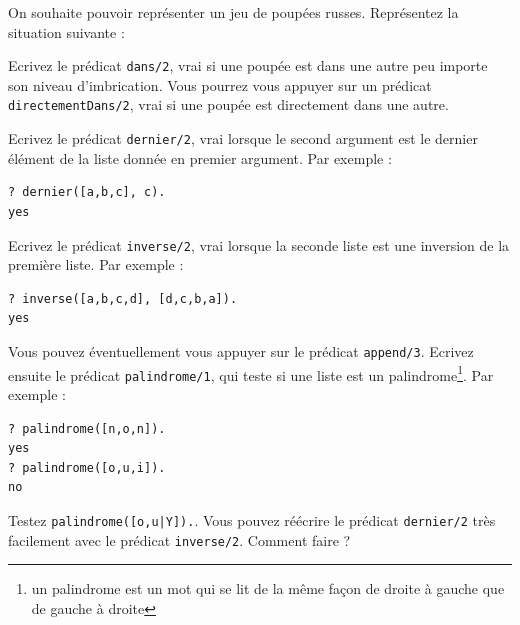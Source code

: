 \documentclass[a4paper]{article}
\newenvironment{CAnswer}{\color{red}\begin{Answer}}
                        {\end{Answer}}
\begin{document}
\begin{Exercise}[title={Poupées russes}]
On souhaite pouvoir représenter un jeu de poupées russes. Représentez la
situation suivante :
\begin{center}
\end{center}
Ecrivez le prédicat \verb$dans/2$, vrai si une poupée est dans une autre peu
importe son niveau d'imbrication. Vous pourrez vous appuyer sur un prédicat
\verb$directementDans/2$, vrai si une poupée est directement dans une autre.
\end{Exercise}
\begin{CAnswer}

\end{CAnswer}

\begin{Exercise}[title={Dernier}]
Ecrivez le prédicat \verb$dernier/2$, vrai lorsque le second argument est le
dernier élément de la liste donnée en premier argument. Par exemple :
\begin{verbatim}
?­ dernier([a,b,c], c).
yes
\end{verbatim}
\end{Exercise}
\begin{CAnswer}

\end{CAnswer}

\begin{Exercise}[title={Inversion}]
\Question Ecrivez le prédicat \verb$inverse/2$, vrai lorsque la seconde liste
est une inversion de la première liste. Par exemple :
\begin{verbatim}
?­ inverse([a,b,c,d], [d,c,b,a]).
yes
\end{verbatim}
Vous pouvez éventuellement vous appuyer sur le prédicat \verb$append/3$.
\Question Ecrivez ensuite le prédicat \verb$palindrome/1$, qui teste si une
liste est un palindrome\footnote{un palindrome est un mot qui se lit de la
même façon de droite à gauche que de gauche à droite}. Par exemple :
\begin{verbatim}
?­ palindrome([n,o,n]).
yes
?­ palindrome([o,u,i]).
no
\end{verbatim}
Testez \verb$palindrome([o,u|Y]).$.
\Question Vous pouvez réécrire le prédicat \verb$dernier/2$ très facilement
avec le prédicat \verb$inverse/2$. Comment faire ?
\end{Exercise}
\begin{CAnswer}

\end{CAnswer}
\end{document}
